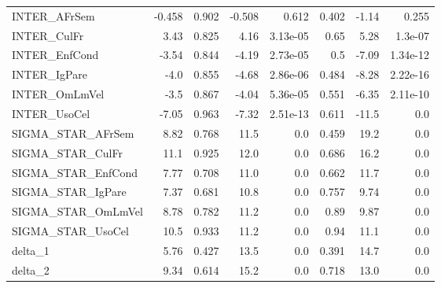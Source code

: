 \begin{tabular}{lrrrrrrr}
INTER\_AFrSem       & -0.458 &    0.902 &  -0.508 &    0.612 &         0.402 &        -1.14 &         0.255 \\
INTER\_CulFr        &   3.43 &    0.825 &    4.16 & 3.13e-05 &          0.65 &         5.28 &       1.3e-07 \\
INTER\_EnfCond      &  -3.54 &    0.844 &   -4.19 & 2.73e-05 &           0.5 &        -7.09 &      1.34e-12 \\
INTER\_IgPare       &   -4.0 &    0.855 &   -4.68 & 2.86e-06 &         0.484 &        -8.28 &      2.22e-16 \\
INTER\_OmLmVel      &   -3.5 &    0.867 &   -4.04 & 5.36e-05 &         0.551 &        -6.35 &      2.11e-10 \\
INTER\_UsoCel       &  -7.05 &    0.963 &   -7.32 & 2.51e-13 &         0.611 &        -11.5 &           0.0 \\
SIGMA\_STAR\_AFrSem  &   8.82 &    0.768 &    11.5 &      0.0 &         0.459 &         19.2 &           0.0 \\
SIGMA\_STAR\_CulFr   &   11.1 &    0.925 &    12.0 &      0.0 &         0.686 &         16.2 &           0.0 \\
SIGMA\_STAR\_EnfCond &   7.77 &    0.708 &    11.0 &      0.0 &         0.662 &         11.7 &           0.0 \\
SIGMA\_STAR\_IgPare  &   7.37 &    0.681 &    10.8 &      0.0 &         0.757 &         9.74 &           0.0 \\
SIGMA\_STAR\_OmLmVel &   8.78 &    0.782 &    11.2 &      0.0 &          0.89 &         9.87 &           0.0 \\
SIGMA\_STAR\_UsoCel  &   10.5 &    0.933 &    11.2 &      0.0 &          0.94 &         11.1 &           0.0 \\
delta\_1            &   5.76 &    0.427 &    13.5 &      0.0 &         0.391 &         14.7 &           0.0 \\
delta\_2            &   9.34 &    0.614 &    15.2 &      0.0 &         0.718 &         13.0 &           0.0 \\
\bottomrule
\end{tabular}

